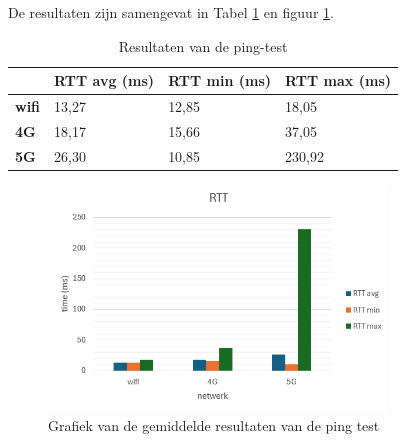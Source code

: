 De resultaten zijn samengevat in Tabel \ref{tab:latency} en figuur \ref{fig:latency}.
\begin{table}[]
    \caption{Resultaten van de ping-test} \label{tab:latency}
        \begin{tabular}{l l l l}
            \cline{2-4}
            & \textbf{RTT avg (ms)} & \textbf{RTT min (ms)} & \textbf{RTT max (ms)} \\ \hline
            \multicolumn{1}{l}{\textbf{wifi}} & 13,27          & 12,85          & 18,05           \\ \hline
            \multicolumn{1}{l}{\textbf{4G}}   & 18,17         & 15,66           & 37,05           \\ \hline            
            \multicolumn{1}{l}{\textbf{5G}}   & 26,30           & 10,85            & 230,92         \\ \hline
        \end{tabular}
        
    
\end{table}

\begin{figure}
    \includegraphics[width=0.8\textwidth]{../graphics/RTT_grafiek.png}
    \caption[Grafiek van de gemiddelde resultaten van de ping test]{\label{fig:latency}Grafiek van de gemiddelde resultaten van de ping test}
\end{figure}
